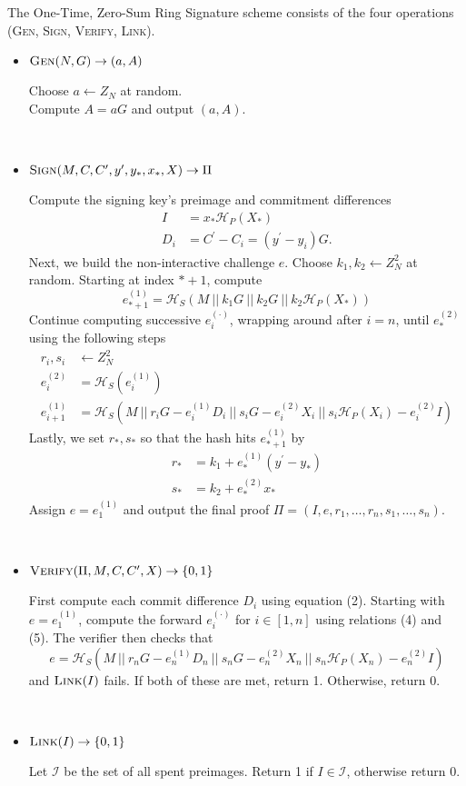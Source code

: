 \documentclass{article}
\newcommand{\algoname}[1]{\textnormal{\textsc{#1}}}
\newcommand{\gen}{\algoname{Gen}}
\newcommand{\sign}{\algoname{Sign}}
\newcommand{\verify}{\algoname{Verify}}
\newcommand{\link}{\algoname{Link}}
\newcommand{\sidx}{\ensuremath{*}}
\newcommand{\sx}{\ensuremath{x_\sidx}}
\newcommand{\ipk}{\ensuremath{X_i}}
\newcommand{\spk}{\ensuremath{X_\sidx}}
\newcommand{\iy}{\ensuremath{y_i}}
\newcommand{\sy}{\ensuremath{y_\sidx}}
\newcommand{\oy}{\ensuremath{y^\prime}}
\newcommand{\iC}{\ensuremath{C_i}}
\newcommand{\oC}{\ensuremath{C^\prime}}
\newcommand{\setI}{\ensuremath{\mathcal{I}}}
\newcommand{\hs}{\ensuremath{\mathcal{H}_S}}
\newcommand{\hp}{\ensuremath{\mathcal{H}_P}}
\begin{document}
The One-Time, Zero-Sum Ring Signature scheme consists of the four operations
({\gen}, {\sign}, {\verify}, {\link}).  
\begin{itemize}
  \item ${\gen}(N, G) \rightarrow (a, A)$

    Choose $a \leftarrow Z_N$ at random. \\
    Compute $A=aG$ and output $(a, A)$.

\ \\

  \item ${\sign}(M, C, {\oC}, {\oy}, {\sy}, {\sx}, X) \rightarrow \Pi $

    Compute the signing key's preimage and commitment differences
    \begin{align}
      I   &= {\sx} \hp({\spk}) \\
      D_i &= {\oC} - {\iC} = ({\oy} - {\iy}) G.
    \end{align}
    Next, we build the non-interactive challenge $e$.  Choose $k_1, k_2
    \leftarrow Z_N^2$ at random.  Starting at index $*+1$, compute \[
    e_{*+1}^{(1)} = \hs(M ~ || ~ k_1 G ~ || ~ k_2 G ~ || ~ k_2 \hp(\spk) )\]
    Continue computing successive $e_i^{(\cdot)}$, wrapping around after $i=n$,
    until $e_{*}^{(2)}$ using the following steps 
    \begin{align} 
      r_i, s_i &\leftarrow Z_N^2 \\
      e_i^{(2)} &= \hs(e_i^{(1)}) \\
      e_{i+1}^{(1)} &= \hs(M ~ || ~ r_iG - e_i^{(1)}D_i ~ || ~ s_iG - e_i^{(2)}{\ipk} ~ || ~ s_i \hp({\ipk}) - e_i^{(2)}I)
    \end{align}
    Lastly, we set $r_*, s_*$ so that the hash hits $e_{*+1}^{(1)}$
    by
    \begin{align*}
      r_* &= k_1 + e_*^{(1)}({\oy} - {\sy}) \\
      s_* &= k_2 + e_*^{(2)}{\sx}
    \end{align*}
    Assign $e=e_1^{(1)}$ and output the final proof 
    $\Pi = (I, e, r_1, \dots, r_n, s_1, \dots, s_n)$.

\ \\

  \item ${\verify}(\Pi, M, C, {\oC}, X) \rightarrow \{0,1\} $

    First compute each commit difference $D_i$ using equation (2).  Starting
    with $e=e_1^{(1)}$, compute the forward $e_i^{(\cdot)}$ for $i \in [1, n]$
    using relations (4) and (5).  The verifier then checks that 
    \[e = \hs(M ~ 
    || ~ r_nG - e_n^{(1)}D_n ~ 
    || ~ s_nG - e_n^{(2)}X_n ~ 
    || ~ s_n \hp(X_n) - e_n^{(2)}I)\]
    and ${\link}(I)$ fails.  If both of these are met, return 1. Otherwise, return
    0.

\ \\

  \item $\link(I) \rightarrow \{0,1\}$

  Let {\setI} be the set of all spent preimages.  Return 1 if $I \in {\setI}$,
  otherwise return 0.
\end{itemize}
\end{document}
